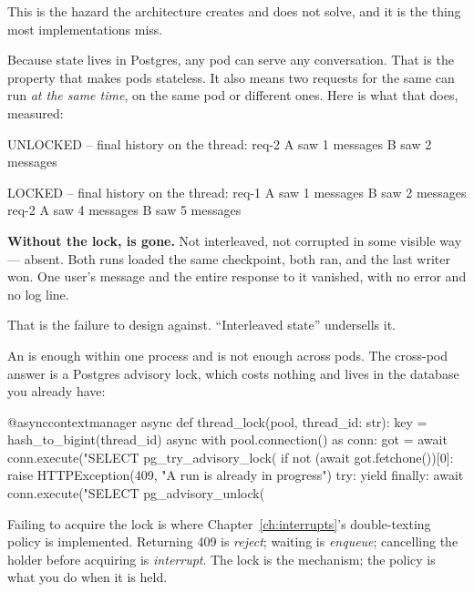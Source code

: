 This is the hazard the architecture creates and does not solve, and it is the
thing most implementations miss.

Because state lives in Postgres, any pod can serve any conversation. That is the
property that makes pods stateless. It also means two requests for the same
 can run \emph{at the same time}, on the same pod or different
ones. Here is what that does, measured:

\begin{console}
UNLOCKED -- final history on the thread:
    req-2
    A saw 1 messages
    B saw 2 messages

LOCKED -- final history on the thread:
    req-1
    A saw 1 messages
    B saw 2 messages
    req-2
    A saw 4 messages
    B saw 5 messages
\end{console}

\begin{warning}
\textbf{Without the lock,  is gone.} Not interleaved, not corrupted
in some visible way --- absent. Both runs loaded the same checkpoint, both ran,
and the last writer won. One user's message and the entire response to it
vanished, with no error and no log line.

That is the failure to design against. ``Interleaved state'' undersells it.
\end{warning}


An  is enough within one process and is not enough across
pods. The cross-pod answer is a Postgres advisory lock, which costs nothing and
lives in the database you already have:

\begin{python}[caption={A lock that works across pods}, label={lst:advisory-lock}]
@asynccontextmanager
async def thread_lock(pool, thread_id: str):
    key = hash_to_bigint(thread_id)
    async with pool.connection() as conn:
        got = await conn.execute("SELECT pg_try_advisory_lock(%
        if not (await got.fetchone())[0]:
            raise HTTPException(409, "A run is already in progress")
        try:
            yield
        finally:
            await conn.execute("SELECT pg_advisory_unlock(%
\end{python}

\begin{note}
Failing to acquire the lock is where Chapter~\ref{ch:interrupts}'s double-texting
policy is implemented. Returning 409 is \emph{reject}; waiting is
\emph{enqueue}; cancelling the holder before acquiring is \emph{interrupt}.
The lock is the mechanism; the policy is what you do when it is held.
\end{note}


